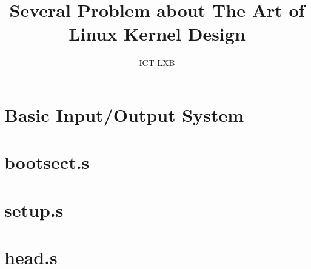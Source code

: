 \documentclass[a4paper, 11pt]{article}
\title{Several Problem about The Art of Linux Kernel Design}
\author{ICT-LXB}
\begin{document}
\maketitle
\tableofcontents
\section{Basic Input/Output System}
\section{bootsect.s}
\section{setup.s}
\section{head.s}
\end{document}

